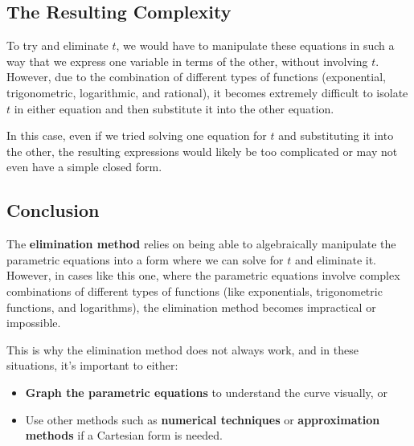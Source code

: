 \documentclass{article}
\begin{document}
\begin{warningbox}
    \subsection*{The Resulting Complexity}
    
    To try and eliminate \( t \), we would have to manipulate these equations in such a way that we express one variable in terms of the other, without involving \( t \). However, due to the combination of different types of functions (exponential, trigonometric, logarithmic, and rational), it becomes extremely difficult to isolate \( t \) in either equation and then substitute it into the other equation.
    
    In this case, even if we tried solving one equation for \( t \) and substituting it into the other, the resulting expressions would likely be too complicated or may not even have a simple closed form.
    
    \subsection*{Conclusion}
    
    The \textbf{elimination method} relies on being able to algebraically manipulate the parametric equations into a form where we can solve for \( t \) and eliminate it. However, in cases like this one, where the parametric equations involve complex combinations of different types of functions (like exponentials, trigonometric functions, and logarithms), the elimination method becomes impractical or impossible.
    
    This is why the elimination method does not always work, and in these situations, it's important to either:
    \begin{itemize}
        \item \textbf{Graph the parametric equations} to understand the curve visually, or
        \item Use other methods such as \textbf{numerical techniques} or \textbf{approximation methods} if a Cartesian form is needed.
    \end{itemize}    
\end{warningbox}
\end{document}
